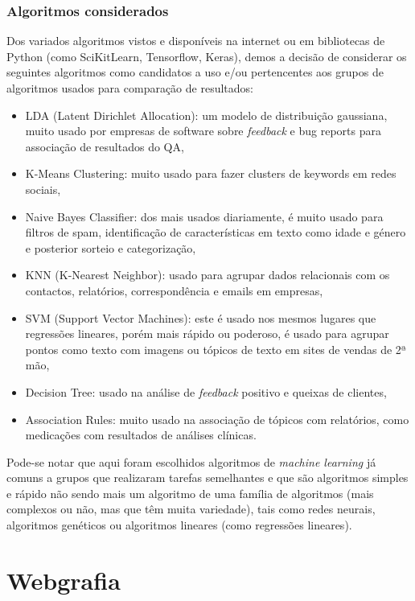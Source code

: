 \documentclass[a4paper,10pt]{article}
\begin{document}
\subsubsection{Algoritmos considerados}

Dos variados algoritmos vistos e disponíveis na internet ou em bibliotecas de Python (como SciKitLearn, Tensorflow, Keras), demos a decisão de considerar os seguintes algoritmos como candidatos a uso e/ou pertencentes aos grupos de algoritmos usados para comparação de resultados:
\begin{itemize}
    \item LDA (Latent Dirichlet Allocation): um modelo de distribuição gaussiana, muito usado por empresas de software sobre \textit{feedback} e bug reports para associação de resultados do QA,
    \item K-Means Clustering: muito usado para fazer clusters de keywords em redes sociais,
    \item Naive Bayes Classifier: dos mais usados diariamente, é muito usado para filtros de spam, identificação de características em texto como idade e género e posterior sorteio e categorização,
    \item KNN (K-Nearest Neighbor): usado para agrupar dados relacionais com os contactos, relatórios, correspondência e emails em empresas,
    \item SVM (Support Vector Machines): este é usado nos mesmos lugares que regressões lineares, porém mais rápido ou poderoso, é usado para agrupar pontos como texto com imagens ou tópicos de texto em sites de vendas de 2ª mão,
    \item Decision Tree: usado na análise de \textit{feedback} positivo e queixas de clientes,
    \item Association Rules: muito usado na associação de tópicos com relatórios, como medicações com resultados de análises clínicas.
\end{itemize}

Pode-se notar que aqui foram escolhidos algoritmos de \textit{machine learning} já comuns a grupos que realizaram tarefas semelhantes e que são algoritmos simples e rápido não sendo mais um algoritmo de uma família de algoritmos (mais complexos ou não, mas que têm muita variedade), tais como redes neurais, algoritmos genéticos ou algoritmos lineares (como regressões lineares).

\section{Webgrafia}
\end{document}
